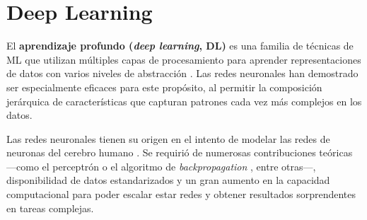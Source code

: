 








\section{Deep Learning}

El \textbf{aprendizaje profundo (\textit{deep learning}, DL)} es una familia de técnicas de ML que utilizan 
múltiples capas de procesamiento para aprender representaciones de datos con varios niveles de abstracción
\cite{lecun2015}. Las redes neuronales han demostrado ser especialmente eficaces para este propósito, al 
permitir la composición jerárquica de características que capturan patrones cada vez más complejos en los 
datos.

Las redes neuronales tienen su origen en el intento de modelar las redes de neuronas del cerebro humano 
\cite{mcculloch1943}. Se requirió de numerosas contribuciones teóricas ---como el perceptrón 
\cite{rosenblatt1958} o el algoritmo de \textit{backpropagation} \cite{rumelhart1986,werbos1994}, entre 
otras---, disponibilidad de datos estandarizados y un gran aumento en la capacidad computacional para poder 
escalar estar redes y obtener resultados 
sorprendentes en tareas complejas.

